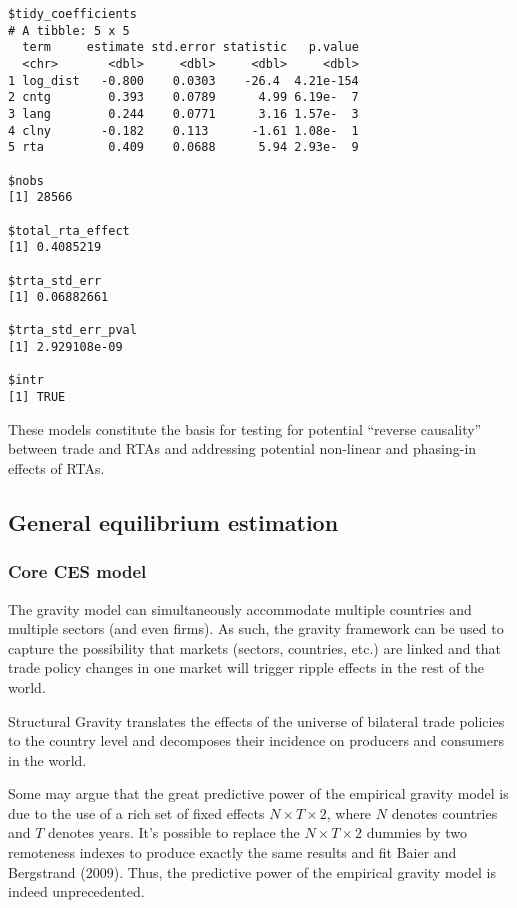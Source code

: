 \documentclass[12pt,reqno,oneside,pdftex]{formato-puc/puctesis} %
\begin{document}
\begin{verbatim}
$tidy_coefficients
# A tibble: 5 x 5
  term     estimate std.error statistic   p.value
  <chr>       <dbl>     <dbl>     <dbl>     <dbl>
1 log_dist   -0.800    0.0303    -26.4  4.21e-154
2 cntg        0.393    0.0789      4.99 6.19e-  7
3 lang        0.244    0.0771      3.16 1.57e-  3
4 clny       -0.182    0.113      -1.61 1.08e-  1
5 rta         0.409    0.0688      5.94 2.93e-  9

$nobs
[1] 28566

$total_rta_effect
[1] 0.4085219

$trta_std_err
[1] 0.06882661

$trta_std_err_pval
[1] 2.929108e-09

$intr
[1] TRUE
\end{verbatim}

These models constitute the basis for testing for potential ``reverse
causality'' between trade and RTAs and addressing potential non-linear
and phasing-in effects of RTAs.

\hypertarget{general-equilibrium-estimation}{%
\subsection{General equilibrium
estimation}\label{general-equilibrium-estimation}}

\hypertarget{core-ces-model}{%
\subsubsection{Core CES model}\label{core-ces-model}}

The gravity model can simultaneously accommodate multiple countries and
multiple sectors (and even firms). As such, the gravity framework can be
used to capture the possibility that markets (sectors, countries, etc.)
are linked and that trade policy changes in one market will trigger
ripple effects in the rest of the world.

Structural Gravity translates the effects of the universe of bilateral
trade policies to the country level and decomposes their incidence on
producers and consumers in the world.

Some may argue that the great predictive power of the empirical gravity
model is due to the use of a rich set of fixed effects
\(N \times T \times 2\), where \(N\) denotes countries and \(T\) denotes
years. It's possible to replace the \(N \times T \times 2\) dummies by
two remoteness indexes to produce exactly the same results and fit Baier
and Bergstrand (2009). Thus, the predictive power of the empirical
gravity model is indeed unprecedented.
\end{document}

